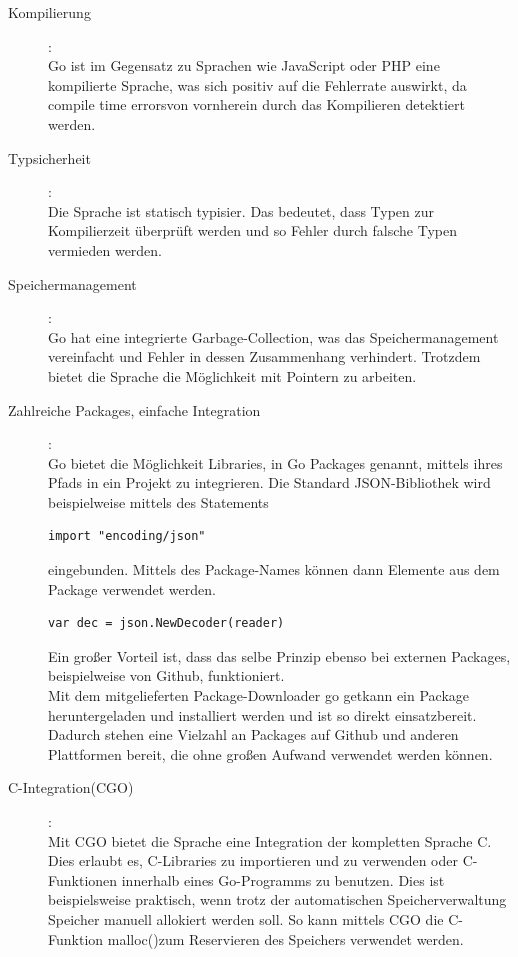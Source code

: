 \documentclass[a4paper,10pt]{scrartcl}
\begin{document}
\begin{description}
\item[Kompilierung]:\\

Go ist im Gegensatz zu Sprachen wie JavaScript oder PHP eine kompilierte Sprache, was sich positiv auf die Fehlerrate auswirkt, da \glqq compile time errors\grqq von vornherein durch das Kompilieren detektiert werden.\\

\item[Typsicherheit]:\\

Die Sprache ist statisch typisier. Das bedeutet, dass Typen zur Kompilierzeit überprüft werden und so Fehler durch falsche Typen vermieden werden. 

\item[Speichermanagement]:\\

Go hat eine integrierte Garbage-Collection, was das Speichermanagement vereinfacht und Fehler in dessen Zusammenhang verhindert. Trotzdem bietet die Sprache die Möglichkeit mit Pointern zu arbeiten.


\item[Zahlreiche Packages, einfache Integration]:\\

Go bietet die Möglichkeit Libraries, in Go Packages genannt, mittels ihres Pfads in ein Projekt zu integrieren. Die Standard JSON-Bibliothek wird beispielweise mittels des Statements 

\begin{lstlisting}
import "encoding/json"
\end{lstlisting}

eingebunden. Mittels des Package-Names können dann Elemente aus dem Package verwendet werden.


\begin{lstlisting}
var dec = json.NewDecoder(reader)
\end{lstlisting}

Ein großer Vorteil ist, dass das selbe Prinzip ebenso bei externen Packages, beispielweise von Github, funktioniert.\\
Mit dem mitgelieferten Package-Downloader \glqq go get\grqq kann ein Package heruntergeladen und installiert werden und ist so direkt einsatzbereit. Dadurch stehen eine Vielzahl an Packages auf Github und anderen Plattformen bereit, die ohne großen Aufwand verwendet werden können.

\item[C-Integration(CGO)]:\\

Mit CGO bietet die Sprache eine Integration der kompletten Sprache C. Dies erlaubt es,  C-Libraries zu importieren und zu verwenden oder C-Funktionen innerhalb eines Go-Programms zu benutzen. Dies ist beispielsweise praktisch, wenn trotz der automatischen Speicherverwaltung Speicher manuell allokiert werden soll. So kann mittels CGO die C-Funktion \glqq malloc()\grqq zum Reservieren des Speichers verwendet werden.

\end{description}
\end{document}
